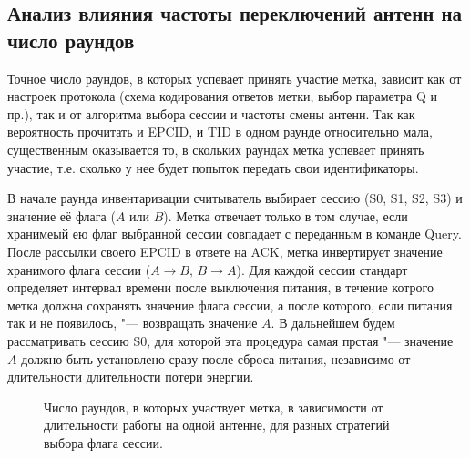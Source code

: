 \subsection{Анализ влияния частоты переключений антенн на число раундов}
Точное число раундов, в которых успевает принять участие метка, зависит как от настроек протокола (схема кодирования ответов метки, выбор параметра Q и пр.), так и от алгоритма выбора сессии и частоты смены антенн. Так как вероятность прочитать и EPCID, и TID в одном раунде относительно мала, существенным оказывается то, в скольких раундах метка успевает принять участие, т.е. сколько у нее будет попыток передать свои идентификаторы.

В начале раунда инвентаризации считыватель выбирает сессию (S0, S1, S2, S3) и значение её флага ($A$ или $B$). Метка отвечает только в том случае, если хранимеый ею флаг выбранной сессии совпадает с переданным в команде Query. После рассылки своего EPCID в ответе на ACK, метка инвертирует значение хранимого флага сессии ($A \rightarrow B,\, B \rightarrow A$). Для каждой сессии стандарт определяет интервал времени после выключения питания, в течение котрого метка должна сохранять значение флага сессии, а после которого, если питания так и не появилось, "--- возвращать значение $A$. В дальнейшем будем рассматривать сессию S0, для которой эта процедура самая прстая "--- значение $A$ должно быть установлено сразу после сброса питания, независимо от длительности длительности потери энергии.

\begin{figure}[!t]
	\caption{Число раундов, в которых участвует метка, в зависимости от длительности работы на одной антенне, для разных стратегий выбора флага сессии.}
	\label{fig:ch2_rounds_per_tag}
\end{figure}

